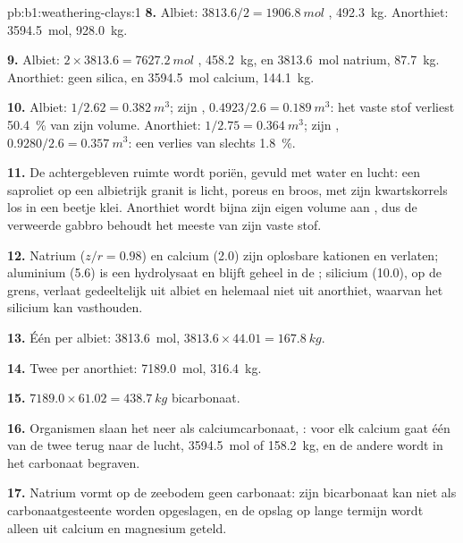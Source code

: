 \begin{solution}{pb:b1:weathering-clays:1}
\textbf{8.} Albiet: $3813.6/2 = \qty{1906.8}{mol}$ , \qty{492.3}{kg}.
Anorthiet: \qty{3594.5}{mol}, \qty{928.0}{kg}.

\textbf{9.} Albiet: $2\times3813.6 = \qty{7627.2}{mol}$ , \qty{458.2}{kg}, en
\qty{3813.6}{mol} natrium, \qty{87.7}{kg}. Anorthiet: geen silica, en
\qty{3594.5}{mol} calcium, \qty{144.1}{kg}.

\textbf{10.} Albiet: $1/2.62 = \qty{0.382}{m^3}$; zijn ,
$0.4923/2.6 = \qty{0.189}{m^3}$: het vaste stof verliest \qty{50.4}{\percent} van zijn
volume. Anorthiet: $1/2.75 = \qty{0.364}{m^3}$; zijn ,
$0.9280/2.6 = \qty{0.357}{m^3}$: een verlies van slechts \qty{1.8}{\percent}.

\textbf{11.} De achtergebleven ruimte wordt poriën, gevuld met water en lucht: een
saproliet op een albietrijk granit is licht, poreus en broos, met zijn kwartskorrels los
in een beetje klei. Anorthiet wordt bijna zijn eigen volume aan , dus de
verweerde gabbro behoudt het meeste van zijn vaste stof.

\textbf{12.} Natrium ($z/r = 0.98$) en calcium (2.0) zijn oplosbare kationen en verlaten;
aluminium (5.6) is een hydrolysaat en blijft geheel in de ; silicium (10.0), op
de grens, verlaat gedeeltelijk uit albiet en helemaal niet uit anorthiet, waarvan het
silicium  kan vasthouden.

\textbf{13.} Één  per albiet: \qty{3813.6}{mol}, $3813.6 \times 44.01 =
\qty{167.8}{kg}$.

\textbf{14.} Twee per anorthiet: \qty{7189.0}{mol}, \qty{316.4}{kg}.

\textbf{15.} $7189.0 \times 61.02 = \qty{438.7}{kg}$ bicarbonaat.

\textbf{16.} Organismen slaan het neer als calciumcarbonaat,
: voor elk calcium gaat één van de twee
 terug naar de lucht, \qty{3594.5}{mol} of \qty{158.2}{kg}, en de andere wordt
in het carbonaat begraven.

\textbf{17.} Natrium vormt op de zeebodem geen carbonaat: zijn bicarbonaat kan niet als
carbonaatgesteente worden opgeslagen, en de opslag op lange termijn wordt alleen uit
calcium en magnesium geteld.


\end{solution}
